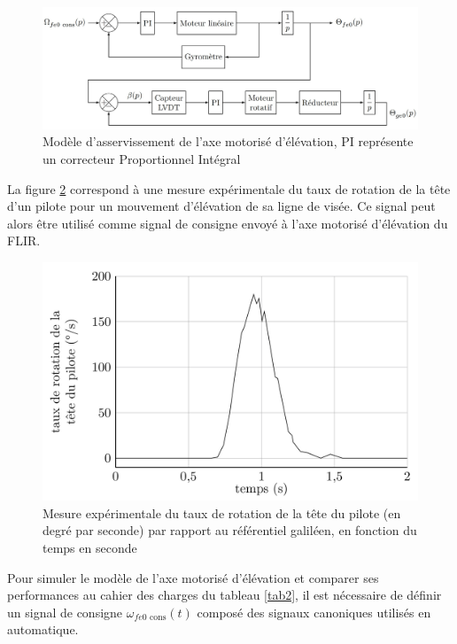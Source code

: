 \begin{figure}[!htb]
\begin{center}
\includegraphics[width=1.0\textwidth]{images/figure18.jpg}
\caption{Modèle d'asservissement de l'axe motorisé d'élévation, PI représente un correcteur Proportionnel
Intégral \label{fig18}}
\end{center}
\end{figure}

La figure \ref{fig19} correspond à une mesure expérimentale du taux de rotation de la tête d'un pilote pour un mouvement
d'élévation de sa ligne de visée. Ce signal peut alors être utilisé comme signal de consigne envoyé à l'axe motorisé
d'élévation du FLIR.

\begin{figure}[!htb]
\begin{center}
\includegraphics[width=1.0\textwidth]{images/figure19.jpg}
\caption{Mesure expérimentale du taux de rotation de la tête du
pilote (en degré par seconde) par rapport au référentiel galiléen, en
fonction du temps en seconde \label{fig19}}
\end{center}
\end{figure}

Pour simuler le modèle de l'axe motorisé d'élévation et comparer ses performances au cahier des charges du tableau \ref{tab2}, il est nécessaire de définir un signal de consigne $\omega_{fe0\text{ cons}}(t)$ composé des signaux canoniques utilisés
en automatique.

